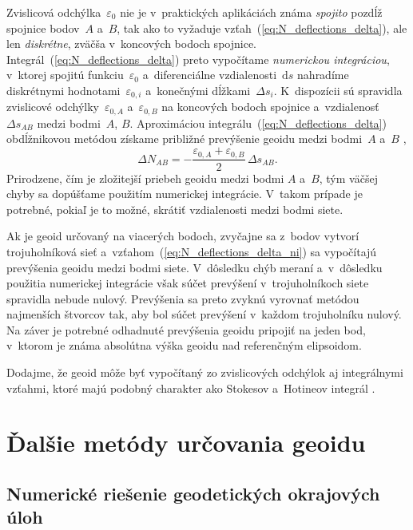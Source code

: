 \documentclass[a4paper, 12pt]{book}
\newcommand{\diff}{\mathrm d}
\begin{document}
Zvislicová odchýlka~$\varepsilon_0$ nie je v~praktických aplikáciách známa 
\emph{spojito} pozdĺž spojnice bodov~$A$ a~$B$, tak ako to vyžaduje 
vzťah~(\ref{eq:N_deflections_delta}), ale len \emph{diskrétne}, zväčša 
v~koncových bodoch spojnice.  Integrál~(\ref{eq:N_deflections_delta}) preto 
vypočítame \emph{numerickou integráciou}, v~ktorej spojitú 
funkciu~$\varepsilon_0$ a~diferenciálne vzdialenosti~$\diff s$ nahradíme 
diskrétnymi hodnotami~$\varepsilon_{0,i}$ a~konečnými dĺžkami~$\Delta s_i$.  
K~dispozícii sú spravidla zvislicové odchýlky~$\varepsilon_{0,A}$ 
a~$\varepsilon_{0,B}$ na koncových bodoch spojnice a~vzdialenosť~$\Delta 
s_{AB}$ medzi bodmi~$A$, $B$.  Aproximáciou 
integrálu~(\ref{eq:N_deflections_delta}) obdĺžnikovou metódou získame približné 
prevýšenie geoidu medzi bodmi~$A$ a~$B$ \parencite[pre popis obdĺžnikovej 
metódy pozri napríklad][]{Macak2021},
%
\begin{equation}
\label{eq:N_deflections_delta_ni}
\Delta N_{AB} = -\frac{\varepsilon_{0,A} + \varepsilon_{0,B}}{2} \, \Delta 
s_{AB}{.}
\end{equation}
%
Prirodzene, čím je zložitejší priebeh geoidu medzi bodmi $A$ a~$B$, tým väčšej 
chyby sa dopúšťame použitím numerickej integrácie.  V~takom prípade je 
potrebné, pokiaľ je to možné, skrátiť vzdialenosti medzi bodmi siete.

Ak je geoid určovaný na viacerých bodoch, zvyčajne sa z~bodov vytvorí 
trojuholníková sieť a~vzťahom~(\ref{eq:N_deflections_delta_ni}) sa vypočítajú 
prevýšenia geoidu medzi bodmi siete.  V~dôsledku chýb meraní a~v~dôsledku 
použitia numerickej integrácie však súčet prevýšení v~trojuholníkoch siete 
spravidla nebude nulový.  Prevýšenia sa preto zvyknú vyrovnať metódou 
najmenších štvorcov tak, aby bol súčet prevýšení v~každom trojuholníku nulový.  
Na záver je potrebné odhadnuté prevýšenia geoidu pripojiť na jeden bod, 
v~ktorom je známa absolútna výška geoidu nad referenčným elipsoidom.

Dodajme, že geoid môže byť vypočítaný zo zvislicových odchýlok aj integrálnymi 
vzťahmi, ktoré majú podobný charakter ako Stokesov a~Hotineov integrál 
\parencite[pozri napríklad][]{Sjoberg2017}.


\section{Ďalšie metódy určovania geoidu}
\label{sec:other_geoid_determination_methods}

\subsection{Numerické riešenie geodetických okrajových úloh}
\end{document}
